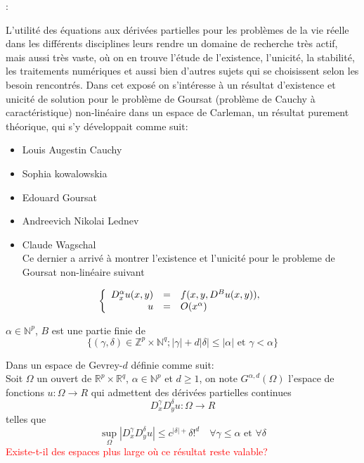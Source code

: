 \documentclass{beamer}
\newcommand{\Np}{\ensuremath{\mathbb{N}^p}}
\newcommand{\Mpq}{\ensuremath{\mathbb{R}^p\times \mathbb{R}^q}}
\newcommand{\ZpNq}{\ensuremath{\mathbb{Z}^p\times \mathbb{N}^q}}
\begin{document}
\begin{frame}{\secname : \subsecname}

L'utilité des équations aux dérivées partielles pour les problèmes de la vie réelle dans les différents disciplines leurs rendre un domaine de recherche très actif, mais aussi très vaste, où on en trouve l'étude de l'existence, l'unicité, la stabilité, les traitements numériques et aussi bien d'autres sujets qui se choisissent selon les besoin rencontrés. Dans cet exposé on s'intéresse à un résultat d'existence et unicité de solution pour le problème de Goursat (problème de Cauchy à caractéristique) non-linéaire dans un espace de Carleman, un résultat purement théorique, qui s'y  développait comme suit:

\end{frame}

\begin{frame}
\begin{itemize}
\item Louis Augestin Cauchy 
\item Sophia kowalowskia 
\item Edouard Goursat 
\item Andreevich Nikolai Lednev  	 
\item Claude Wagschal\\
 Ce dernier a arrivé à montrer l'existence et l'unicité pour le probleme de Goursat non-linéaire suivant 
\end{itemize}
\begin{equation*}
 \left\{
 \begin{array}{r c l}
 D^\alpha_x u(x,y)&=& f(x,y,D^Bu(x,y)),\\
 u&=&O(x^\alpha)
 \end{array}
 \right.
\end{equation*}

$ \alpha \in  \Np$, $ B $  est une partie finie de $$ \{ ( \gamma , \delta) \in \ZpNq ; |\gamma| +d|\delta|\leq | \alpha| \text{ et } \gamma < \alpha\}$$


\end{frame}



\begin{frame}
Dans un espace de Gevrey-$d$ définie comme suit:\\ 
\medskip
Soit $ \Omega $ un ouvert de $ \Mpq $, $\alpha \in \Np $ et $d \geq 1 $, on note $G^{\alpha , d}(\Omega)$ l'espace de fonctions $ u : \Omega \rightarrow R$ qui admettent des dérivées partielles continues $$D^\gamma_x D^\delta_yu: \Omega \rightarrow R$$ 
telles que 
$$ \sup_\Omega | D^\gamma_x D^\delta_yu| \leq c^{|\delta|+}\delta!^d \quad \forall \gamma \leq \alpha \text{ et } \forall \delta$$
\textcolor{red}{Existe-t-il des espaces plus large où ce résultat reste valable? }
\end{frame}
\end{document}
